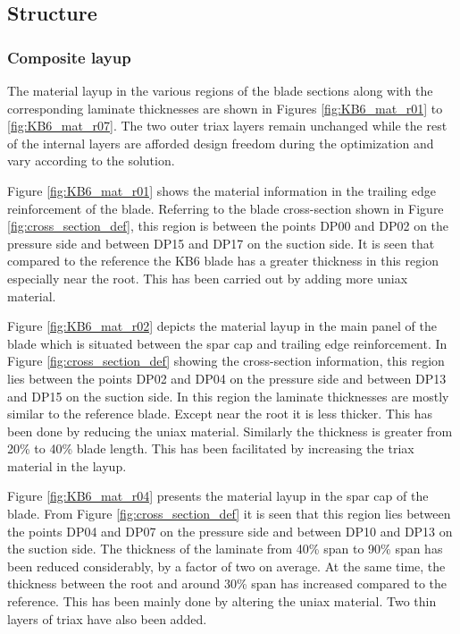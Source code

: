 \subsection{Structure}
\label{subsec:KB6_structure}

\subsubsection*{Composite layup}
The material layup in the various regions of the blade sections along with the corresponding laminate thicknesses are shown in Figures \ref{fig:KB6_mat_r01} to \ref{fig:KB6_mat_r07}. The two outer triax layers remain unchanged while the rest of the internal layers are afforded design freedom during the optimization and vary according to the solution. 

Figure \ref{fig:KB6_mat_r01} shows the material information in the trailing edge reinforcement of the blade. Referring to the blade cross-section shown in Figure \ref{fig:cross_section_def}, this region is between the points DP00 and DP02 on the pressure side and between DP15 and DP17 on the suction side. It is seen that compared to the reference the KB6 blade has a greater thickness in this region especially near the root. This has been carried out by adding more uniax material.

Figure \ref{fig:KB6_mat_r02} depicts the material layup in the main panel of the blade which is situated between the spar cap and trailing edge reinforcement. In Figure \ref{fig:cross_section_def} showing the cross-section information, this region lies between the points DP02 and DP04 on the pressure side and between DP13 and DP15 on the suction side. In this region the laminate thicknesses are mostly similar to the reference blade. Except near the root it is less thicker. This has been done by reducing the uniax material. Similarly the thickness is greater from 20\% to 40\% blade length. This has been facilitated by increasing the triax material in the layup. 

Figure \ref{fig:KB6_mat_r04} presents the material layup in the spar cap of the blade. From Figure \ref{fig:cross_section_def} it is seen that this region lies between the points DP04 and DP07 on the pressure side and between DP10 and DP13 on the suction side. The thickness of the laminate from 40\% span to 90\% span has been reduced considerably, by a factor of two on average. At the same time, the thickness between the root and around 30\% span has increased compared to the reference. This has been mainly done by altering the uniax material. Two thin layers of triax have also been added.

